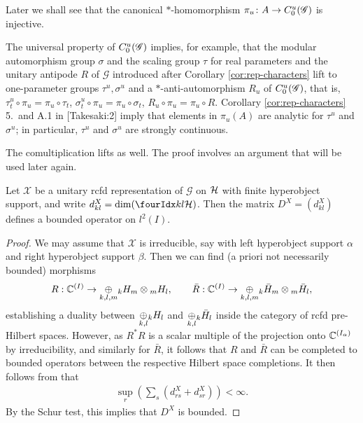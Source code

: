 Later we shall see that the canonical $*$-homomorphism $\pi_{u} \colon A \to
\CuG$ is injective.


The universal property of $\CuG$ implies, for example, that the modular automorphism
group $\sigma$ and the scaling group $\tau$ for real parameters and
the unitary antipode $R$ of $\mathscr{G}$ introduced after Corollary
\ref{cor:rep-characters} lift to one-parameter groups
$\tau^{u},\sigma^{u}$ and a $*$-anti-automorphism $R_{u}$ of $\CuG$,
that is, $\tau^{u}_{t} \circ \pi_{u}= \pi_{u} \circ \tau_{t}$,
$\sigma^{u}_{t} \circ \pi_{u} = \pi_{u} \circ \sigma_{t}$, $R_{u}
\circ \pi_{u} = \pi_{u} \circ R$. Corollary \ref{cor:rep-characters}
5.\ and A.1 in \cite{} [Takesaki:2] imply that elements in
$\pi_{u}(A)$ are analytic for $\tau^{u}$ and $\sigma^{u}$; in
particular, $\tau^{u}$ and $\sigma^{u}$ are strongly continuous.

The comultiplication lifts as well.  The proof involves an argument
that will be used later again.
 \begin{Lem} \label{LemBoundDim} Let $\mathscr{X}$ be a unitary rcfd representation of $\mathscr{G}$ on $\Hsp$ with finite hyperobject support, and write $d^X_{kl} = \dim(\Gru{\Hsp}{k}{l})$. Then the matrix $D^X = (d^X_{kl})$ defines a bounded operator on $l^2(I)$. 
  \end{Lem}
  \begin{proof} We may assume that $\mathscr{X}$ is irreducible, say
    with left hyperobject support $\alpha$ and right hyperobject support
    $\beta$. Then we can find (a priori not necessarily bounded)
    morphisms \[R: \C^{(I)}\rightarrow \underset{k,l,m}{\oplus} \GrDA{H}{k}{m}\otimes
    \GrDA{H}{m}{l},\qquad \bar{R}: \C^{(I)} \rightarrow \underset{k,l,m}{\oplus}
    \GrDA{\bar{H}}{k}{m}\otimes \GrDA{\bar{H}}{m}{l},\] establishing a
    duality between $\underset{k,l}{\oplus} \GrDA{H}{k}{l}$ and
    $\underset{k,l}{\oplus}\GrDA{\bar{H}}{k}{l}$ inside the category of
    rcfd pre-Hilbert spaces. However, as $R^*R$ is a scalar multiple
    of the projection onto $\C^{(I_{\alpha})}$ by irreducibility, and
    similarly for $\bar{R}$, it follows that $R$ and $\bar{R}$ can be
    completed to bounded operators between the respective Hilbert
    space completions. It then follows from \cite[Lemma A.3.2]{DCY1}
    that 
    \begin{align} \label{eq:dim-estimate}
  \sup_r (\sum_s (d_{rs}^X+d_{sr}^X)) < \infty.    
    \end{align}
 By the Schur test,
    this implies that $D^X$ is bounded.
\end{proof} 


